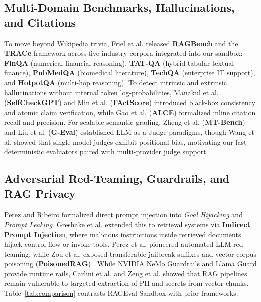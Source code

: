 \documentclass[conference]{IEEEtran}
\begin{document}
\subsection{Multi-Domain Benchmarks, Hallucinations, and Citations}
To move beyond Wikipedia trivia, Friel et al. released \textbf{RAGBench} \cite{friel2024ragbench} and the \textbf{TRACe} framework across five industry corpora integrated into our sandbox: \textbf{FinQA} \cite{chen2021finqa} (numerical financial reasoning), \textbf{TAT-QA} \cite{zhu2021tatqa} (hybrid tabular-textual finance), \textbf{PubMedQA} \cite{jin2019pubmedqa} (biomedical literature), \textbf{TechQA} \cite{castelli2020techqa} (enterprise IT support), and \textbf{HotpotQA} \cite{yang2018hotpotqa} (multi-hop reasoning). To detect intrinsic and extrinsic hallucinations \cite{ji2023survey, honovich2022true} without internal token log-probabilities, Manakul et al. (\textbf{SelfCheckGPT}) \cite{manakul2023selfcheckgpt} and Min et al. (\textbf{FActScore}) \cite{min2023factscore} introduced black-box consistency and atomic claim verification, while Gao et al. (\textbf{ALCE}) \cite{gao2023alce} formalized inline citation recall and precision. For scalable semantic grading, Zheng et al. (\textbf{MT-Bench}) \cite{zheng2023judging} and Liu et al. (\textbf{G-Eval}) \cite{liu2023geval} established LLM-as-a-Judge paradigms, though Wang et al. \cite{wang2024fair} showed that single-model judges exhibit positional bias, motivating our fast deterministic evaluators paired with multi-provider judge support.

\subsection{Adversarial Red-Teaming, Guardrails, and RAG Privacy}
Perez and Ribeiro \cite{perez2022ignore} formalized direct prompt injection into \textit{Goal Hijacking} and \textit{Prompt Leaking}. Greshake et al. \cite{greshake2023indirect} extended this to retrieval systems via \textbf{Indirect Prompt Injection}, where malicious instructions inside retrieved documents hijack control flow or invoke tools. Perez et al. \cite{perez2022redteaming} pioneered automated LLM red-teaming, while Zou et al. exposed transferable jailbreak suffixes \cite{zou2023universal} and vector corpus poisoning (\textbf{PoisonedRAG}) \cite{zou2025poisonedrag}. While NVIDIA NeMo Guardrails \cite{rebedea2023nemo} and Llama Guard \cite{inan2023llamaguard} provide runtime rails, Carlini et al. \cite{carlini2021extracting} and Zeng et al. \cite{zeng2024goodbad} showed that RAG pipelines remain vulnerable to targeted extraction of PII and secrets from vector chunks. Table~\ref{tab:comparison} contrasts RAGEval-Sandbox with prior frameworks.
\end{document}
